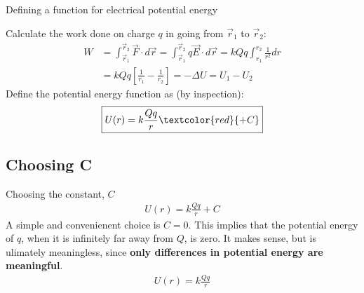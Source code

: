 \documentclass[aspectratio=169,
hyperref={colorlinks,urlcolor=blue}
]{beamer}
\begin{document}
\begin{frame}{Defining a function for electrical potential energy}
\vspace{-0.25cm}
\begin{center}
\end{center}
Calculate the work done on charge $q$ in going from $\vec r_1$ to $\vec r_2$:
\begin{align*}
W&=\int_{\vec r_1}^{\vec r_2}\vec F\cdot d\vec r = \int_{\vec r_1}^{\vec r_2}q\vec E\cdot d\vec r =kQq\int_{ r_1}^{r_2}\frac{1}{r^2}dr\\
&=kQq\left[ \frac{1}{r_1}-\frac{1}{r_2} \right] = -\Delta U = U_1 - U_2
\end{align*}
Define the potential energy function as (by inspection):
\begin{align*}
\boxed{U(r) = k\frac{Qq}{r} \textcolor{red}{+C}}
\end{align*}
\end{frame}


\subsection{Choosing C}
\label{subsec:choosingC}
\begin{frame}{Choosing the constant, $C$}
\begin{align*}
U(r) = k\frac{Qq}{r} +C
\end{align*}
A simple and convenienent choice is $C=0$. This implies that the potential energy of $q$, when it is infinitely far away from $Q$, is zero. It makes sense, but is ulimately meaningless, since \textbf{only differences in potential energy are meaningful}.
\begin{align*}
\boxed{U(r) = k\frac{Qq}{r}}
\end{align*}
\end{frame}
\end{document}
